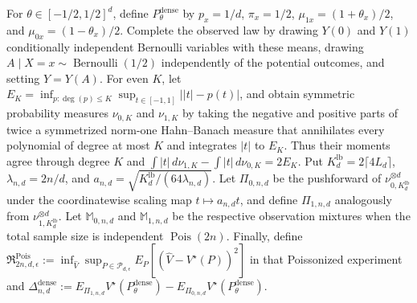 For \(\theta\in[-1/2,1/2]^d\), define \(P_\theta^{\mathrm{dense}}\) by \(p_x=1/d\), \(\pi_x=1/2\), \(\mu_{1x}=(1+\theta_x)/2\), and \(\mu_{0x}=(1-\theta_x)/2\). Complete the observed law by drawing \(Y(0)\) and \(Y(1)\) conditionally independent Bernoulli variables with these means, drawing \(A\mid X=x\sim\operatorname{Bernoulli}(1/2)\) independently of the potential outcomes, and setting \(Y=Y(A)\). For even \(K\), let \(E_K=\inf_{p:\deg(p)\leq K}\sup_{t\in[-1,1]}\lvert\lvert t\rvert-p(t)\rvert\), and obtain symmetric probability measures \(\nu_{0,K}\) and \(\nu_{1,K}\) by taking the negative and positive parts of twice a symmetrized norm-one Hahn--Banach measure that annihilates every polynomial of degree at most \(K\) and integrates \(\lvert t\rvert\) to \(E_K\). Thus their moments agree through degree \(K\) and \(\int\lvert t\rvert\,d\nu_{1,K}-\int\lvert t\rvert\,d\nu_{0,K}=2E_K\). Put \(K_d^{\mathrm{lb}}=2\lceil4L_d\rceil\), \(\lambda_{n,d}=2n/d\), and \(a_{n,d}=\sqrt{K_d^{\mathrm{lb}}/(64\lambda_{n,d})}\). Let \(\Pi_{0,n,d}\) be the pushforward of \(\nu_{0,K_d^{\mathrm{lb}}}^{\otimes d}\) under the coordinatewise scaling map \(t\mapsto a_{n,d}t\), and define \(\Pi_{1,n,d}\) analogously from \(\nu_{1,K_d^{\mathrm{lb}}}^{\otimes d}\). Let \(\mathbb M_{0,n,d}\) and \(\mathbb M_{1,n,d}\) be the respective observation mixtures when the total sample size is independent \(\operatorname{Pois}(2n)\). Finally, define \(\mathfrak R^{\mathrm{Pois}}_{2n,d,\epsilon}:=\inf_{\widehat V}\sup_{P\in\mathcal P_{d,\epsilon}}E_P[(\widehat V-V^\star(P))^2]\) in that Poissonized experiment and \(\Delta_{n,d}^{\mathrm{dense}}:=E_{\Pi_{1,n,d}}V^\star(P_\theta^{\mathrm{dense}})-E_{\Pi_{0,n,d}}V^\star(P_\theta^{\mathrm{dense}})\).